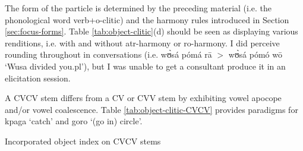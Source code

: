 \begin{exe}
\begin{exe}
\begin{exe}
\begin{exe}
\begin{exe}
\begin{exe}
\begin{exe}
\begin{exe}
\begin{exe}
\begin{exe}
\begin{exe}
\begin{exe}
\begin{table}[!htb]
{}
\end{table}
The form of the  particle is determined by the preceding material (i.e. the phonological word  verb+{\sc o}-clitic) and the harmony rules introduced in Section \ref{sec:focus-forms}.  Table \ref{tab:object-clitic}(d) should be seen as displaying various renditions, i.e. with and without {\sc atr-}harmony or {\sc ro-}harmony.  I did perceive rounding throughout in conversations (i.e.  {\sls wʊ̀sá pómá rā} $>$ {\sls wʊ̀sá pómó wō} `Wusa divided you.{\sc pl}'), but I was unable to get a consultant  produce it in an elicitation session. 
 
 A CVCV stem differs from a CV or CVV stem by exhibiting vowel apocope and/or vowel coalescence.  Table \ref{tab:object-clitic-CVCV} provides paradigms for {\sls kpaga} `catch' and {\sls goro} `(go in) circle'. 

 \begin{table}[!htb]
\centering
\caption{Incorporated object index on  CVCV stems
\label{tab:object-clitic-CVCV}}

\quad
{}
\end{table}


\end{exe}
\end{exe}
\end{exe}
\end{exe}
\end{exe}
\end{exe}
\end{exe}
\end{exe}
\end{exe}
\end{exe}
\end{exe}
\end{exe}
